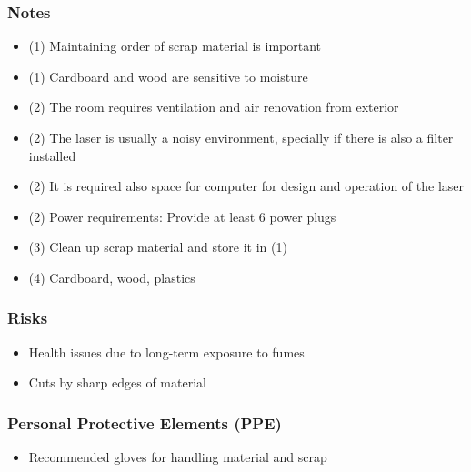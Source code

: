 \documentclass[a4paper,12pt,titlepage]{article}
\begin{document}
\subsubsection*{Notes}
\begin{itemize}
\item (1) Maintaining order of scrap material is important
\item (1) Cardboard and wood are sensitive to moisture
\item (2) The room requires ventilation and air renovation from exterior
\item (2) The laser is usually a noisy environment, specially if there is also a filter installed
\item (2) It is required also space for computer for design and operation of the laser
\item (2) Power requirements: Provide at least 6 power plugs
\item (3) Clean up scrap material and store it in (1)
\item (4) Cardboard, wood, plastics
\end{itemize}
\subsubsection*{Risks}
\begin{itemize}
\item Health issues due to long-term exposure to fumes 
\item Cuts by sharp edges of material
\end{itemize}
\subsubsection*{Personal Protective Elements (PPE)}
\begin{itemize}
\item Recommended gloves for handling material and scrap
\end{itemize}

\clearpage
\end{document}
